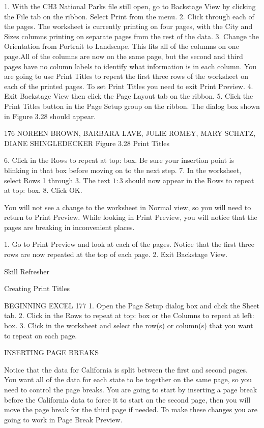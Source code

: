 1. With the CH3 National Parks file still open, go to Backstage View by clicking the File tab on the
ribbon. Select Print from the menu.
2. Click through each of the pages. The worksheet is currently printing on four pages, with the
City and Sizes columns printing on separate pages from the rest of the data.
3. Change the Orientation from Portrait to Landscape. This fits all of the columns on one page.All
of the columns are now on the same page, but the second and third pages have no column labels
to identify what information is in each column. You are going to use Print Titles to repeat the
first three rows of the worksheet on each of the printed pages. To set Print Titles you need to
exit Print Preview.
4. Exit Backstage View then click the Page Layout tab on the ribbon.
5. Click the Print Titles button in the Page Setup group on the ribbon. The dialog box shown
in Figure 3.28 should appear.




176 NOREEN BROWN, BARBARA LAVE, JULIE ROMEY, MARY SCHATZ, DIANE SHINGLEDECKER
Figure 3.28 Print Titles


6. Click in the Rows to repeat at top: box. Be sure your insertion point is blinking in that box before
moving on to the next step.
7. In the worksheet, select Rows 1 through 3. The text $1:$3 should now appear in the Rows to
repeat at top: box.
8. Click OK.

You will not see a change to the worksheet in Normal view, so you will need to return to Print
Preview. While looking in Print Preview, you will notice that the pages are breaking in inconvenient
places.

1. Go to Print Preview and look at each of the pages. Notice that the first three rows are now
repeated at the top of each page.
2. Exit Backstage View.


Skill Refresher


Creating Print Titles


BEGINNING EXCEL 177
1. Open the Page Setup dialog box and click the Sheet tab.
2. Click in the Rows to repeat at top: box or the Columns to repeat at left: box.
3. Click in the worksheet and select the row(s) or column(s) that you want to repeat on each page.



INSERTING PAGE BREAKS

Notice that the data for California is split between the first and second pages. You want all of the data
for each state to be together on the same page, so you need to control the page breaks. You are going
to start by inserting a page break before the California data to force it to start on the second page,
then you will move the page break for the third page if needed. To make these changes you are going
to work in Page Break Preview.

